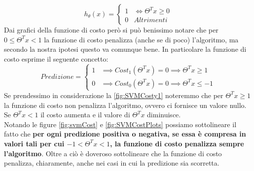   \[h_\theta(x) =
    \begin{cases}
      1& \iff \Theta^Tx \geq 0 \\
      0& Altrimenti
    \end{cases}
  \]
Dai grafici della funzione di costo però si può benissimo notare che per $0 \leq \Theta^Tx < 1$ la funzione di costo penalizza (anche se di poco) l'algoritmo, ma secondo la nostra ipotesi questo va comunque bene. In particolare la funzione di costo esprime il seguente concetto:
  \[Predizione =
    \begin{cases}
      1& \implies Cost_1(\Theta^Tx) = 0 \implies \Theta^Tx \geq 1\\
      0& \implies Cost_0(\Theta^Tx) = 0  \implies \Theta^Tx \leq -1
    \end{cases}
  \]
Se prendessimo in considerazione la \ref{fig:SVMCosty1} noteremmo che per $\Theta^Tx \geq 1$ la funzione di costo non penalizza l'algoritmo, ovvero ci fornisce un valore nullo. Se $\Theta^Tx < 1$ il costo aumenta e il valore di $\Theta^Tx$ diminuisce.\\ 
Notando le figure \ref{fig:svmCost} e \ref{fig:SVMCostPlots} possiamo sottolineare il fatto che\textbf{ per ogni predizione positiva o negativa, se essa è compresa in valori tali per cui $-1 < \Theta^Tx < 1$, la funzione di costo penalizza sempre l'algoritmo}. Oltre a ciò è doveroso sottolineare che la funzione di costo penalizza, chiaramente, anche nei casi in cui la predizione sia scorretta.
